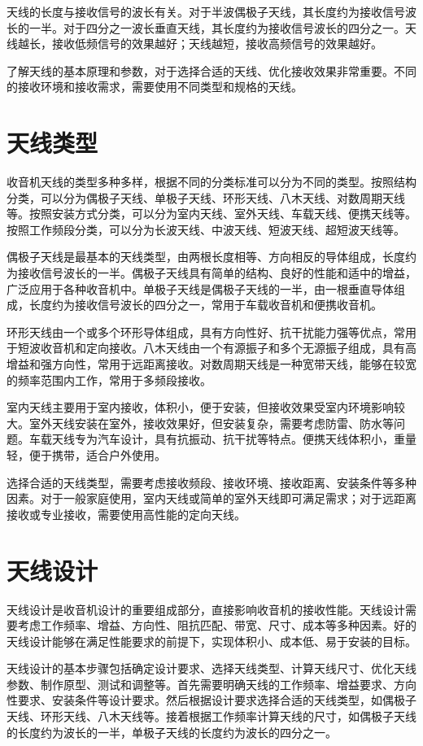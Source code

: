 \documentclass[12pt,UTF8]{ctexbook}
\begin{document}
天线的长度与接收信号的波长有关。对于半波偶极子天线，其长度约为接收信号波长的一半。对于四分之一波长垂直天线，其长度约为接收信号波长的四分之一。天线越长，接收低频信号的效果越好；天线越短，接收高频信号的效果越好。

了解天线的基本原理和参数，对于选择合适的天线、优化接收效果非常重要。不同的接收环境和接收需求，需要使用不同类型和规格的天线。

\section{天线类型}

收音机天线的类型多种多样，根据不同的分类标准可以分为不同的类型。按照结构分类，可以分为偶极子天线、单极子天线、环形天线、八木天线、对数周期天线等。按照安装方式分类，可以分为室内天线、室外天线、车载天线、便携天线等。按照工作频段分类，可以分为长波天线、中波天线、短波天线、超短波天线等。

偶极子天线是最基本的天线类型，由两根长度相等、方向相反的导体组成，长度约为接收信号波长的一半。偶极子天线具有简单的结构、良好的性能和适中的增益，广泛应用于各种收音机中。单极子天线是偶极子天线的一半，由一根垂直导体组成，长度约为接收信号波长的四分之一，常用于车载收音机和便携收音机。

环形天线由一个或多个环形导体组成，具有方向性好、抗干扰能力强等优点，常用于短波收音机和定向接收。八木天线由一个有源振子和多个无源振子组成，具有高增益和强方向性，常用于远距离接收。对数周期天线是一种宽带天线，能够在较宽的频率范围内工作，常用于多频段接收。

室内天线主要用于室内接收，体积小，便于安装，但接收效果受室内环境影响较大。室外天线安装在室外，接收效果好，但安装复杂，需要考虑防雷、防水等问题。车载天线专为汽车设计，具有抗振动、抗干扰等特点。便携天线体积小，重量轻，便于携带，适合户外使用。

选择合适的天线类型，需要考虑接收频段、接收环境、接收距离、安装条件等多种因素。对于一般家庭使用，室内天线或简单的室外天线即可满足需求；对于远距离接收或专业接收，需要使用高性能的定向天线。

\section{天线设计}

天线设计是收音机设计的重要组成部分，直接影响收音机的接收性能。天线设计需要考虑工作频率、增益、方向性、阻抗匹配、带宽、尺寸、成本等多种因素。好的天线设计能够在满足性能要求的前提下，实现体积小、成本低、易于安装的目标。

天线设计的基本步骤包括确定设计要求、选择天线类型、计算天线尺寸、优化天线参数、制作原型、测试和调整等。首先需要明确天线的工作频率、增益要求、方向性要求、安装条件等设计要求。然后根据设计要求选择合适的天线类型，如偶极子天线、环形天线、八木天线等。接着根据工作频率计算天线的尺寸，如偶极子天线的长度约为波长的一半，单极子天线的长度约为波长的四分之一。
\end{document}
